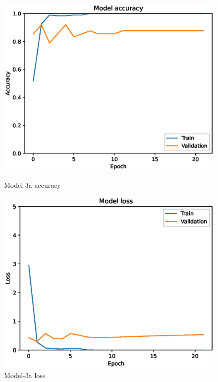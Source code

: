 \begin{figure}
    \centering
    \begin{minipage}{0.45\textwidth}
        \centering
        \includegraphics[width=\textwidth]{./fig/model3/accuracy3a.eps}
        \caption{Model-3a accuracy}
        \label{fig:model3a_acc}
    \end{minipage}
    \begin{minipage}{0.45\textwidth}
        \centering
        \includegraphics[width=\textwidth]{./fig/model3/loss3a.eps}
        \caption{Model-3a loss}
        \label{fig:model3a_loss}
    \end{minipage}
\end{figure}


